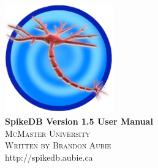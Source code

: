 \documentclass{report}
\begin{document}

\begin{titlepage}
	\begin{center}
		\includegraphics[width=0.35\textwidth]{icon.pdf}\\
		[4.0cm]
		\vspace{0.4cm}
		{ \huge \bfseries SpikeDB Version 1.5 User Manual }\\[0.4cm]
		\vspace{4cm}
		\textsc{\LARGE McMaster University}\\
		[0.5cm]
		\textsc{\Large Written by Brandon Aubie}\\
		\vspace{0.5cm}
		{\large http://spikedb.aubie.ca}

	\end{center}
\end{titlepage}

\tableofcontents 
\end{document}
